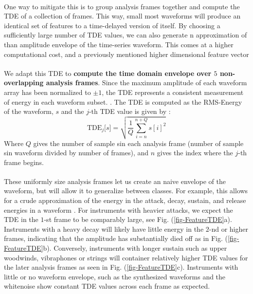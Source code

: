 \documentclass[12pt,letterpaper]{article}
\begin{document}
\paragraph*{}One way to mitigate this is to group analysis frames together and compute the TDE of a collection of frames. This way, small most waveforms will produce an identical set of features to a time-delayed version of itself. By choosing a sufficiently large number of TDE values, we can also generate n approximation of than amplitude envelope of the time-series waveform. This comes at a higher computational cost, and a previously mentioned higher dimensional feature vector

\paragraph*{}We adapt this TDE to \textbf{compute the time domain envelope over $5$ non-overlapping analysis frames}. Since the maximum amplitude of each waveform array has been normalized to $\pm 1$, the TDE represents a consistent measurement of energy in each waveform subset. \cite{Liu}. The TDE is computed as the RMS-Energy of the waveform, $s$ and the $j$-th TDE value is given by \cite{Olson,Serizel}:
\begin{equation}
\label{eqn-RMS}
\text{TDE}_j\big[ s \big] = \sqrt{\frac{1}{Q} \sum_{i=n}^{n+Q} s[i]^2}
\end{equation}
Where $Q$ gives the number of sample sin each analysis frame (number of sample sin waveform divided by number of frames), and $n$ gives the index where the $j$-th frame begins.

\paragraph*{}These uniformly size analysis frames let us create an naive envelope of the waveform, but will allow it to generalize between classes. For example, this allows for a crude approximation of the energy in the attack, decay, sustain, and release energies in a waveform \cite{Virtanen,Olson}. For instruments with heavier attacks, we expect the TDE in the $1$-st frame to be comparably large, see Fig. (\ref{fig-FeatureTDE}a). Instruments with a heavy decay will likely have little energy in the $2$-nd or higher frames, indicating that the amplitude has substantially died off as in Fig. (\ref{fig-FeatureTDE}b). Conversely, instruments with longer sustain such as upper woodwinds, vibraphones or strings will container relatively higher TDE values for the later analysis frames as seen in Fig. (\ref{fig-FeatureTDE}c). Instruments with little or no waveform envelope, such as the synthesized waveforms and the whitenoise show constant TDE values across each frame as expected.
\end{document}
